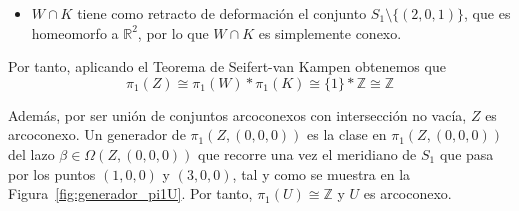 \documentclass[12pt]{article}
\begin{document}
\begin{ejercicio}
\begin{itemize}
\begin{itemize}
\begin{figure}[ht]
                    \caption{Lazo generador $\alpha$ de $\pi_1(K,(2,0,0))$.}
                    \label{fig:generador_pi1K}
                \end{figure}

                \item $W\cap K$ tiene como retracto de deformación el conjunto $S_1\setminus \{(2,0,1)\}$, que es homeomorfo a $\mathbb{R}^2$, por lo que $W\cap K$ es simplemente conexo.
            \end{itemize}

            Por tanto, aplicando el Teorema de Seifert-van Kampen obtenemos que
            $$\pi_1(Z)\cong \pi_1(W)\ast \pi_1(K)\cong \{1\}\ast \mathbb{Z}\cong \mathbb{Z}$$

            Además, por ser unión de conjuntos arcoconexos con intersección no vacía, $Z$ es arcoconexo. Un generador de $\pi_1(Z,(0,0,0))$ es la clase en $\pi_1(Z,(0,0,0))$ del lazo $\beta\in \Omega(Z,(0,0,0))$ que recorre una vez el meridiano de $S_1$ que pasa por los puntos $(1,0,0)$ y $(3,0,0)$, tal y como se muestra en la Figura~\ref{fig:generador_pi1U}. Por tanto, $\pi_1(U)\cong \mathbb{Z}$ y $U$ es arcoconexo.
            \begin{figure}[ht]
                \centering
\end{figure}
\end{itemize}
\end{ejercicio}
\end{document}
